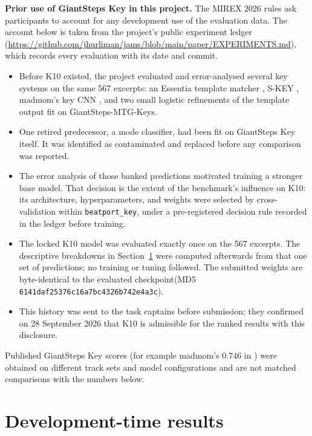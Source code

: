 \documentclass{article}
\begin{document}
\textbf{Prior use of GiantSteps Key in this project.} The MIREX 2026 rules ask
participants to account for any development use of the evaluation data. The account
below is taken from the project's public experiment ledger
(\url{https://github.com/jhurliman/jams/blob/main/paper/EXPERIMENTS.md}), which records every evaluation
with its date and commit.
\begin{itemize}\setlength{\itemsep}{0pt}
\item Before K10 existed, the project evaluated and error-analysed several key systems
on the same 567 excerpts: an Essentia template matcher \cite{faraldo2016key,
bogdanov2013essentia}, S-KEY \cite{kong2025skey}, madmom's key CNN
\cite{korzeniowski2018genre,bock2016madmom}, and two small logistic refinements of the
template output fit on GiantSteps-MTG-Keys.
\item One retired predecessor, a mode classifier, had been fit on GiantSteps Key itself.
It was identified as contaminated and replaced before any comparison was reported.
\item The error analysis of those banked predictions motivated training a stronger base
model. That decision is the extent of the benchmark's influence on K10: its
architecture, hyperparameters, and weights were selected by cross-validation within
\texttt{beatport\_key}, under a pre-registered decision rule recorded in the ledger
before training.
\item The locked K10 model was evaluated exactly once on the 567 excerpts. The
descriptive breakdowns in Section~\ref{sec:results} were computed afterwards from that
one set of predictions; no training or tuning followed. The submitted weights are
byte-identical to the evaluated checkpoint\newline (MD5 {\footnotesize\texttt{6141daf25376c16a7bc4326b742e4a3c}}).
\item This history was sent to the task captains before submission; they confirmed on
28 September 2026 that K10 is admissible for the ranked results with this disclosure.
\end{itemize}
Published GiantSteps Key scores (for example madmom's 0.746 in
\cite{korzeniowski2018genre}) were obtained on different track sets and model
configurations and are not matched comparisons with the numbers below.

\section{Development-time results}
\label{sec:results}
\end{document}
